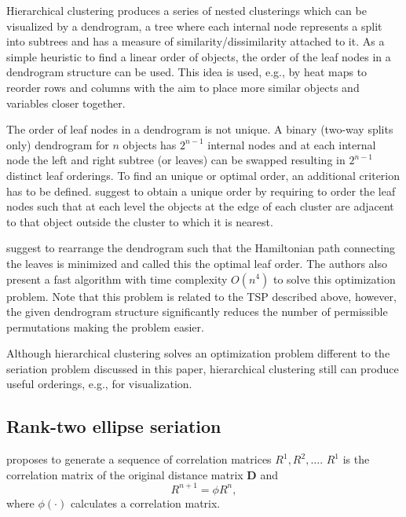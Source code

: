 \documentclass[fleqn, a4paper]{article}
\begin{document}
Hierarchical clustering produces a series of nested clusterings which
can be visualized by a dendrogram, a tree where each internal node
represents a split into subtrees and has a measure of
similarity/dissimilarity attached to it.  As a simple heuristic to find
a linear order of objects, the order of the leaf nodes in a dendrogram
structure can be used. This idea is used, e.g., by heat maps to reorder
rows and columns with the aim to place more similar objects and
variables closer together.

The order of leaf nodes in a dendrogram is not unique.  A binary
(two-way splits only) dendrogram for $n$ objects has $2^{n-1}$ internal
nodes and at each internal node the left and right subtree (or leaves)
can be swapped resulting in $2^{n-1}$ distinct leaf orderings.  To find
an unique or optimal order, an additional criterion has to be defined.
\cite{seriation:Gruvaeus:1972} suggest to obtain a unique order by
requiring to order the leaf nodes such that at each level the objects at
the edge of each cluster are adjacent to that object outside the cluster
to which it is nearest.

\cite{seriation:Bar-Joseph:2001} suggest to rearrange the dendrogram such that
the Hamiltonian path connecting the leaves is minimized and called this the
optimal leaf order. The authors also present a fast algorithm with time
complexity $O(n^4)$ to solve this optimization problem. Note that this problem
is related to the TSP described above, however, the given dendrogram structure
significantly reduces the number of permissible permutations making the problem
easier.

Although hierarchical clustering solves an optimization problem different to
the seriation problem discussed in this paper, hierarchical clustering still
can produce useful orderings, e.g., for visualization.

\subsection{Rank-two ellipse seriation}

\cite{seriation:Chen:2002} proposes to
generate a sequence of correlation matrices
$R^1, R^2, \ldots$. $R^1$ is the correlation matrix
of the original distance matrix $\mathbf{D}$ and
\begin{equation}
R^{n+1} = \phi R^n,
\end{equation}
where $\phi(\cdot)$ calculates a correlation matrix.
\end{document}
